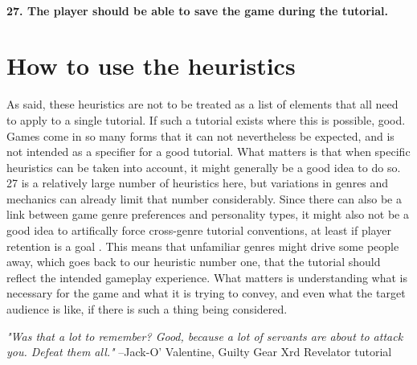\paragraph{27. The player should be able to save the game during the tutorial.}

\section{How to use the heuristics}

As said, these heuristics are not to be treated as a list of elements that all need to apply to a single tutorial. If such a tutorial exists where this is possible, good. Games come in so many forms that it can not nevertheless be expected, and is not intended as a specifier for a good tutorial. What matters is that when specific heuristics can be taken into account, it might generally be a good idea to do so. 27 is a relatively large number of heuristics here, but variations in genres and mechanics can already limit that number considerably. Since there can also be a link between game genre preferences and personality types, it might also not be a good idea to artifically force cross-genre tutorial conventions, at least if player retention is a goal \cite{Peever2012}. This means that unfamiliar genres might drive some people away, which goes back to our heuristic number one, that the tutorial should reflect the intended gameplay experience. What matters is understanding what is necessary for the game and what it is trying to convey, and even what the target audience is like, if there is such a thing being considered. 

\begin{displayquote}{\textit{"Was that a lot to remember?
Good, because a lot of servants are about to attack you.
Defeat them all."}} --Jack-O' Valentine, Guilty Gear Xrd Revelator tutorial
\end{displayquote}












